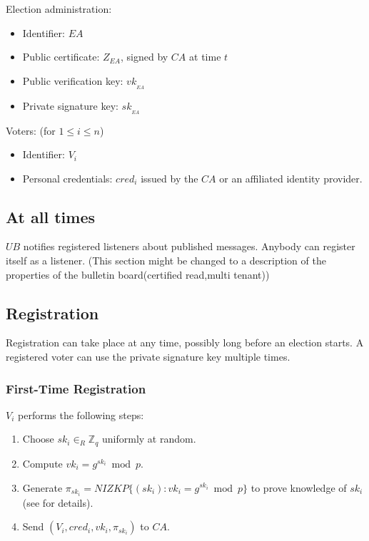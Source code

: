 \documentclass[bibtotoc,halfparskip,oneside]{scrreprt}
\newcommand{\cred}[1]{cred_{#1}\xspace}
\newcommand{\sk}[1]{\mathit{sk}_{#1}\xspace}
\newcommand{\vk}[1]{\mathit{vk}_{#1}\xspace}
\newcommand{\SK}[1]{\sk{_#1}\xspace}
\newcommand{\VK}[1]{\vk{_#1}\xspace}
\newcommand{\CA}{\ensuremath{\mathit{CA}}\xspace}
\newcommand{\EA}{\ensuremath{\mathit{EA}}\xspace}
\newcommand{\UB}{\ensuremath{\mathit{UB}}\xspace}
\newcommand{\Voter}[1]{\ensuremath{\mathit{V}_{#1}}\xspace}
\begin{document}
Election administration:
\begin{itemize}
	\item Identifier: \EA
	\item Public certificate: $Z_{\EA}$, signed by \CA at time $t$
	\item Public verification key: $\VK{\EA}$ 
	\item Private signature key: $\SK{\EA}$
\end{itemize}

Voters: (for $1\leq i\leq n$)
\begin{itemize}
	\item Identifier: $\Voter{i}$
	\item Personal credentials: $\cred{i}$ issued by the \CA or an affiliated identity provider.
\end{itemize}

\subsection{At all times}\label{Atalltimes}

\UB notifies registered listeners about published messages. Anybody can register itself as a listener.
(This section might be changed to a description of the properties of the bulletin board(certified read,multi tenant))

\subsection{Registration}\label{registration}

Registration can take place at any time, possibly long before an election starts. A registered voter can use the private signature key multiple times.

\subsubsection{First-Time Registration}

$\Voter{i}$ performs the following steps:
\begin{enumerate}
	\item Choose $\sk{i}\in_R \mathbb{Z}_q$ uniformly at random.
	\item Compute $\vk{i} = g^{\sk{i}}\bmod{p}$.
	\item Generate $\pi_{\sk{i}}=\mathit{NIZKP}\{(\sk{i}):\vk{i}=g^{\sk{i}}\bmod{p}\}$ to prove knowledge of $\sk{i}$ (see  for details).
	\item Send $(\Voter{i},\cred{i},\vk{i},\pi_{\sk{i}})$ to \CA.
\end{enumerate}
\end{document}

